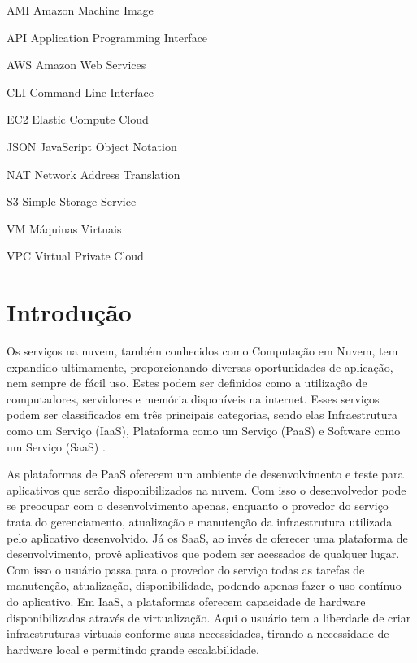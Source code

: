 \documentclass[tg]{mdtufsm}
\begin{document}
\tableofcontents
\listoffigures
\listofappendix

\begin{listofabbrv}{20in}
\item[AMI]	Amazon Machine Image
\item[API]	Application Programming Interface
\item[AWS]	Amazon Web Services
\item[CLI]	Command Line Interface
\item[EC2]	Elastic Compute Cloud
\item[JSON]	JavaScript Object Notation
\item[NAT]	Network Address Translation
\item[S3]	Simple Storage Service
\item[VM]	Máquinas Virtuais
\item[VPC]	Virtual Private Cloud
\end{listofabbrv}



\setlength{\baselineskip}{1.5\baselineskip}

\chapter{Introdução}

Os serviços na nuvem, também conhecidos como Computação em Nuvem, tem expandido ultimamente, proporcionando diversas oportunidades de aplicação, nem sempre de fácil uso. Estes podem ser definidos como a utilização de computadores, servidores e memória disponíveis na internet. Esses serviços podem ser classificados em três principais categorias, sendo elas Infraestrutura como um Serviço (IaaS), Plataforma como um Serviço (PaaS) e Software como um Serviço (SaaS) \cite{xaas2}.

As plataformas de PaaS oferecem um ambiente de desenvolvimento e teste para aplicativos que serão disponibilizados na nuvem. Com isso o desenvolvedor pode se preocupar com o desenvolvimento apenas, enquanto o provedor do serviço trata do gerenciamento, atualização e manutenção da infraestrutura utilizada pelo aplicativo desenvolvido. Já os SaaS, ao invés de oferecer uma plataforma de desenvolvimento, provê aplicativos que podem ser acessados de qualquer lugar. Com isso o usuário passa para o provedor do serviço todas as tarefas de manutenção, atualização, disponibilidade, podendo apenas fazer o uso contínuo do aplicativo. Em IaaS, a plataformas oferecem capacidade de hardware disponibilizadas através de virtualização. Aqui o usuário tem a liberdade de criar infraestruturas virtuais conforme suas necessidades, tirando a necessidade de hardware local e permitindo grande escalabilidade.
\end{document}
